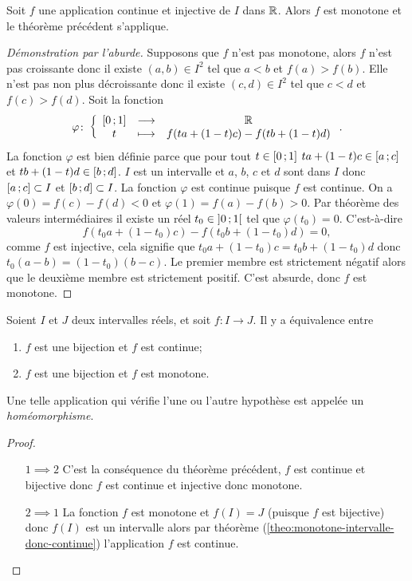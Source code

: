 \begin{theo}
  Soit $f$ une application continue et injective de $I$ dans $\mathbb{R}$. Alors $f$ est monotone et le théorème précédent s'applique.
\end{theo}
\begin{proof}[Démonstration par l'aburde]
  Supposons que $f$ n'est pas monotone, alors $f$ n'est pas croissante donc il existe $(a,b) \in I^2$ tel que $a < b$ et $f(a) > f(b)$. Elle n'est pas non plus décroissante donc il existe $(c,d) \in I^2$ tel que $c < d$ et $f(c) > f(d)$. Soit la fonction
  \begin{equation}
    \varphi\colon \left\{\begin{array}{ccc} \left[ 0 \, ;  1 \right] & \longrightarrow &\mathbb{R}\\ t & \longmapsto & f(ta+(1-t)c)-f(tb+(1-t)d) \end{array} \right..
  \end{equation}
  La fonction $\varphi$ est bien définie parce que pour tout $t \in \left[ 0 \, ;  1 \right]$ $ta+(1-t)c \in \left[ a \, ;  c \right]$ et $tb+(1-t)d \in \left[ b \, ;  d \right]$. $I$ est un intervalle et $a$, $b$, $c$ et $d$ sont dans $I$ donc $\left[ a \, ;  c \right] \subset I$ et $\left[ b \, ;  d \right] \subset I$. La fonction $\varphi$ est continue puisque $f$ est continue. On a $\varphi(0)=f(c)-f(d) <0$ et $\varphi(1)=f(a)-f(b) >0$. Par théorème des valeurs intermédiaires il existe un réel $t_0 \in \left] 0 \, ;  1 \right[$ tel que $\varphi(t_0)=0$. C'est-à-dire
\begin{equation}
  f(t_0a+(1-t_0)c)-f(t_0b+(1-t_0)d)=0,
\end{equation}
comme $f$ est injective, cela signifie que $t_0a+(1-t_0)c=t_0b+(1-t_0)d$ donc $t_0(a-b)=(1-t_0)(b-c)$. Le premier membre est strictement négatif alors que le deuxième membre est strictement positif. C'est absurde, donc $f$ est monotone.
\end{proof}
\begin{cor}
  Soient $I$ et $J$ deux intervalles réels, et soit $f:I\longrightarrow J$. Il y a équivalence entre
  \begin{enumerate}
  \item $f$ est une bijection et $f$ est continue;
  \item $f$ est une bijection et $f$ est monotone.
  \end{enumerate}
  Une telle application qui vérifie l'une ou l'autre hypothèse est appelée un \emph{homéomorphisme}.
\end{cor}
\begin{proof}
  \begin{itemize}
  \item[$1 \implies 2$] C'est la conséquence du théorème précédent, $f$ est continue et bijective donc $f$ est continue et injective donc monotone.
  \item[$2 \implies 1$] La fonction $f$ est monotone et $f(I)=J$ (puisque $f$ est bijective) donc $f(I)$ est un intervalle alors par théorème (\ref{theo:monotone-intervalle-donc-continue}) l'application $f$ est continue.
  \end{itemize}
\end{proof}

